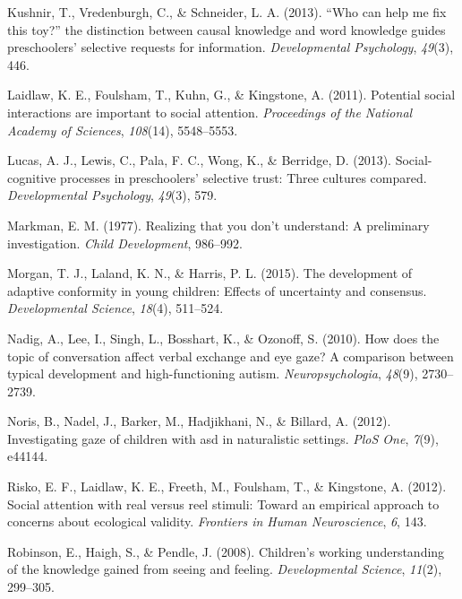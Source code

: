 \documentclass[floatsintext,man]{apa6}
\theoremstyle{definition}
\theoremstyle{definition}
\theoremstyle{definition}
\theoremstyle{remark}
\begin{document}
\hypertarget{ref-kushnir2013can}{}
Kushnir, T., Vredenburgh, C., \& Schneider, L. A. (2013). ``Who can help
me fix this toy?'' the distinction between causal knowledge and word
knowledge guides preschoolers' selective requests for information.
\emph{Developmental Psychology}, \emph{49}(3), 446.

\hypertarget{ref-laidlaw2011potential}{}
Laidlaw, K. E., Foulsham, T., Kuhn, G., \& Kingstone, A. (2011).
Potential social interactions are important to social attention.
\emph{Proceedings of the National Academy of Sciences}, \emph{108}(14),
5548--5553.

\hypertarget{ref-lucas2013social}{}
Lucas, A. J., Lewis, C., Pala, F. C., Wong, K., \& Berridge, D. (2013).
Social-cognitive processes in preschoolers' selective trust: Three
cultures compared. \emph{Developmental Psychology}, \emph{49}(3), 579.

\hypertarget{ref-markman1977realizing}{}
Markman, E. M. (1977). Realizing that you don't understand: A
preliminary investigation. \emph{Child Development}, 986--992.

\hypertarget{ref-morgan2015development}{}
Morgan, T. J., Laland, K. N., \& Harris, P. L. (2015). The development
of adaptive conformity in young children: Effects of uncertainty and
consensus. \emph{Developmental Science}, \emph{18}(4), 511--524.

\hypertarget{ref-nadig2010does}{}
Nadig, A., Lee, I., Singh, L., Bosshart, K., \& Ozonoff, S. (2010). How
does the topic of conversation affect verbal exchange and eye gaze? A
comparison between typical development and high-functioning autism.
\emph{Neuropsychologia}, \emph{48}(9), 2730--2739.

\hypertarget{ref-noris2012investigating}{}
Noris, B., Nadel, J., Barker, M., Hadjikhani, N., \& Billard, A. (2012).
Investigating gaze of children with asd in naturalistic settings.
\emph{PloS One}, \emph{7}(9), e44144.

\hypertarget{ref-risko2012social}{}
Risko, E. F., Laidlaw, K. E., Freeth, M., Foulsham, T., \& Kingstone, A.
(2012). Social attention with real versus reel stimuli: Toward an
empirical approach to concerns about ecological validity.
\emph{Frontiers in Human Neuroscience}, \emph{6}, 143.

\hypertarget{ref-robinson2008children}{}
Robinson, E., Haigh, S., \& Pendle, J. (2008). Children's working
understanding of the knowledge gained from seeing and feeling.
\emph{Developmental Science}, \emph{11}(2), 299--305.
\end{document}
